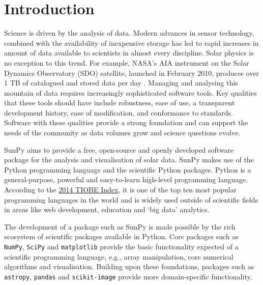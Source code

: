 \section{Introduction}\label{sec:Intro}

Science is driven by the analysis of data. Modern advances in sensor
technology, combined with the availability of inexpensive storage has led to
rapid increases in amount of data available to scientists in almost
every discipline.  Solar physics is no exception to this trend. For example, NASA's
AIA instrument on the Solar Dynamics Observatory (SDO) satellite, launched in February 2010,
produces over 1 TB of catalogued and stored data per day \citep{aia}. Managing and
analysing this mountain of data
requires increasingly sophisticated software tools.  Key qualities
that these tools should have include robustness, ease of use, a
transparent development history, ease of modification, and conformance
to standards.  Software with these qualities provide a strong
foundation and can support the needs of the community as data
volumes grow and science questions evolve.

SunPy aims to provide a free, open-source and openly developed software package 
for the analysis and visualisation of solar data. SunPy makes use of the Python 
programming language and the scientific Python packages. Python is a general-purpose, 
powerful and easy-to-learn high-level programming language.
According to the \href{http://www.tiobe.com/index.php/content/paperinfo/tpci/index.html}{2014 TIOBE Index},
 it is one of the top ten most popular programming languages in the world 
and is widely used outside of scientific fields in areas like web development, education 
and `big data' analytics.


The development of a package such as SunPy is made possible by the 
rich ecosystem of scientific packages available in Python. Core packages such 
as \texttt{NumPy}, \texttt{SciPy} and \texttt{matplotlib} 
provide the basic functionality expected of a scientific programming language,
e.g., array manipulation, core numerical algorithms and visualisation. 
Building upon these foundations, packages such as \texttt{astropy}, \texttt{pandas} and 
\texttt{scikit-image} provide more domain-specific functionality.

